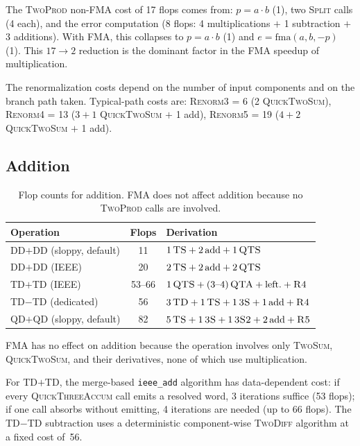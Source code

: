 \documentclass[11pt,a4paper]{article}
\begin{document}
The \textsc{TwoProd} non-FMA cost of 17 flops comes from: $p = a
\cdot b$ (1), two \textsc{Split} calls (4 each), and the error
computation (8 flops: 4 multiplications $+$ 1 subtraction $+$ 3
additions).  With FMA, this collapses to $p = a \cdot b$ (1) and
$e = \mathrm{fma}(a, b, -p)$ (1).  This $17 \to 2$ reduction
is the dominant factor in the FMA speedup of multiplication.

The renormalization costs depend on the number of input
components and on the branch path taken. Typical-path costs are:
\textsc{Renorm3} = 6 (2 \textsc{QuickTwoSum}),
\textsc{Renorm4} = 13 ($3 + 1$ \textsc{QuickTwoSum} $+$ 1 add),
\textsc{Renorm5} = 19 ($4 + 2$ \textsc{QuickTwoSum} $+$ 1 add).

\subsection{Addition}

\begin{table}[h]
\centering
\caption{Flop counts for addition. FMA does not affect addition
  because no \textsc{TwoProd} calls are involved.}
\label{tab:add-flops}
\begin{tabular}{lcl}
\toprule
Operation & Flops & Derivation \\
\midrule
DD$+$DD (sloppy, default)
  & 11
  & $1\,\textsc{TS} + 2\,\text{add} + 1\,\textsc{QTS}$ \\
DD$+$DD (IEEE)
  & 20
  & $2\,\textsc{TS} + 2\,\text{add} + 2\,\textsc{QTS}$ \\
TD$+$TD (IEEE)
  & 53--66
  & $1\,\textsc{QTS} + (3\text{--}4)\,\textsc{QTA}
    + \text{left.} + \textsc{R4}$ \\
TD$-$TD (dedicated)
  & 56
  & $3\,\textsc{TD} + 1\,\textsc{TS}
    + 1\,\textsc{3S} + 1\,\text{add} + \textsc{R4}$ \\
QD$+$QD (sloppy, default)
  & 82
  & $5\,\textsc{TS} + 1\,\textsc{3S} + 1\,\textsc{3S2}
    + 2\,\text{add} + \textsc{R5}$ \\
\bottomrule
\end{tabular}
\end{table}

FMA has no effect on addition because the operation involves only
\textsc{TwoSum}, \textsc{QuickTwoSum}, and their derivatives, none
of which use multiplication.

For TD$+$TD, the merge-based \texttt{ieee\_add} algorithm has
data-dependent cost: if every \textsc{QuickThreeAccum} call emits
a resolved word, 3 iterations suffice (53 flops); if one call
absorbs without emitting, 4 iterations are needed (up to 66 flops).
The TD$-$TD subtraction uses a deterministic component-wise
\textsc{TwoDiff} algorithm at a fixed cost of~56.
\end{document}
